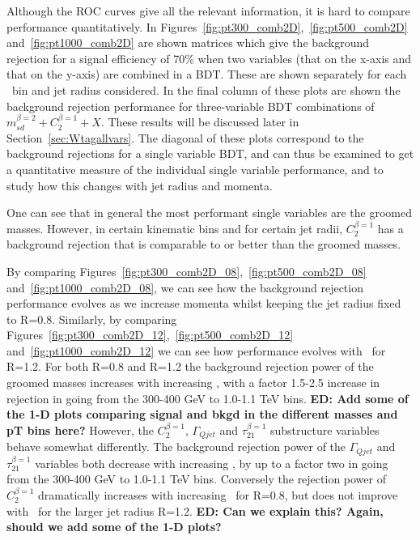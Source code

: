 Although the ROC curves give all the relevant information, it is hard
to compare performance quantitatively. In
Figures~\ref{fig:pt300_comb2D},~\ref{fig:pt500_comb2D}
and~\ref{fig:pt1000_comb2D} are shown matrices which give the
background rejection for a signal efficiency of 70\% when two
variables (that on the x-axis and that on the y-axis) are combined in
a BDT. These are shown separately for each \pt~bin and jet radius
considered. In the
final column of these plots are shown the background rejection
performance for three-variable BDT combinations of $m_{sd}^{\beta=2} +
C_2^{\beta=1} + X$. These results will be discussed later in Section~\ref{sec:Wtagallvars}. The diagonal of these plots correspond to the background
rejections for a single variable BDT, and can thus be examined to get a
quantitative measure of the individual single variable performance,
and to study how this changes with jet radius and momenta. 

One can see that in general the most performant single variables are
the groomed masses. However, in certain kinematic bins and for certain
jet radii, $C_2^{\beta=1}$ has a background rejection that is
comparable to or better than the groomed masses. 

By comparing
Figures~\ref{fig:pt300_comb2D_08},~\ref{fig:pt500_comb2D_08}
and~\ref{fig:pt1000_comb2D_08}, we can see how the background
rejection performance evolves as we increase momenta whilst keeping the jet
radius fixed to R=0.8. Similarly, by comparing Figures~\ref{fig:pt300_comb2D_12},~\ref{fig:pt500_comb2D_12}
and~\ref{fig:pt1000_comb2D_12} we can see how performance evolves with
\pt~for R=1.2. For both R=0.8 and R=1.2 the background rejection power of
the groomed masses increases with increasing \pt, with a factor 1.5-2.5 increase in rejection in going from the 300-400 GeV to
1.0-1.1 TeV bins. {\bf ED: Add some of the 1-D plots comparing signal and bkgd
  in the different masses and pT bins here?} However, the $C_2^{\beta=1}$, $\Gamma_{Qjet}$ and
$\tau_{21}^{\beta=1}$ substructure variables behave somewhat
differently. The background rejection power of the $\Gamma_{Qjet}$ and
$\tau_{21}^{\beta=1}$ variables both decrease with increasing \pt, by
up to a factor two in going from the 300-400 GeV to
1.0-1.1 TeV bins. Conversely the rejection power of $C_2^{\beta=1}$
dramatically increases with increasing \pt~for R=0.8, but does not
improve with \pt~for the larger jet radius R=1.2. {\bf ED: Can we
  explain this? Again, should we add some of the 1-D plots?}

